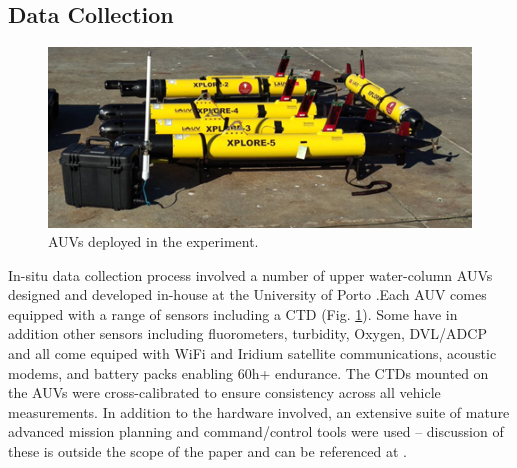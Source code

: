 \subsection{Data Collection}


\begin{figure}
    \centering
    \includegraphics[width=.7\linewidth]{fig/lauvs.png}
    \caption{AUVs deployed in the \proj experiment.}
    \label{fig:lauvs}
\end{figure}

In-situ data collection process involved a number of upper
water-column AUVs designed and developed in-house at the University of
Porto \cite{sousa2012lauv}.Each AUV comes equipped with a range of
sensors including a CTD (Fig. \ref{fig:lauvs}). Some have in addition
other sensors including fluorometers, turbidity, Oxygen, DVL/ADCP and
all come equiped with WiFi and Iridium satellite communications,
acoustic modems, and battery packs enabling 60h+ endurance. The CTDs
mounted on the AUVs were cross-calibrated to ensure consistency across
all vehicle measurements. In addition to the hardware involved, an
extensive suite of mature advanced mission planning and
command/control tools were used -- discussion of these is outside the
scope of the paper and can be referenced at
\cite{dias2005neptus,seacons10,toolchain2012,pinto2013lsts,Ferreira2018}.



